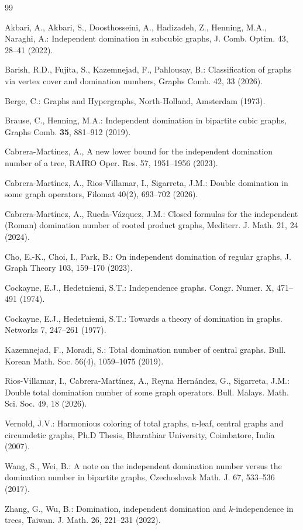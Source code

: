 \documentclass[12pt]{article}
\begin{document}
\begin{thebibliography}{99}

Akbari, A., Akbari, S., Doosthosseini, A., Hadizadeh, Z., Henning,  M.A., Naraghi, A.: Independent domination in subcubic graphs, J. Comb. Optim. 43, 28--41 (2022).


Barish, R.D., Fujita, S., Kazemnejad, F., Pahlousay, B.: Classification of graphs via vertex cover and domination numbers, Graphs Comb. 42, 33 (2026).

Berge, C.: Graphs and Hypergraphs, North-Holland, Amsterdam (1973).

Brause, C., Henning, M.A.: Independent domination in bipartite cubic graphs, Graphs Comb. \textbf{35}, 881--912 (2019).

Cabrera-Mart\'inez, A., A new lower bound for the independent domination number of a tree, RAIRO Oper. Res. 57, 1951--1956 (2023).


Cabrera-Mart\'inez, A., Rios-Villamar, I., Sigarreta, J.M.: Double domination in some graph operators, Filomat 40(2), 693--702 (2026).

Cabrera-Mart\'inez, A., Rueda-V\'azquez, J.M.: Closed formulas for the independent (Roman) domination number of rooted product graphs,  Mediterr. J. Math. 21, 24 (2024).

Cho, E.-K., Choi, I., Park, B.: On independent domination of regular graphs, J. Graph Theory 103, 159--170 (2023).

Cockayne, E.J., Hedetniemi, S.T.: Independence graphs. Congr. Numer. X, 471--491 (1974).

Cockayne, E.J., Hedetniemi, S.T.: Towards a theory of domination in graphs. Networks 7, 247--261 (1977).


Kazemnejad, F., Moradi, S.: Total domination number of central graphs. Bull. Korean Math. Soc. 56(4),
1059--1075 (2019).

Rios-Villamar, I., Cabrera-Mart\'inez, A., Reyna Hern\'andez, G., Sigarreta, J.M.: Double total domination number of some graph operators. Bull. Malays. Math. Sci. Soc. 49, 18 (2026). 


Vernold, J.V.: Harmonious coloring of total graphs, n-leaf, central graphs and circumdetic graphs, Ph.D Thesis, Bharathiar University, Coimbatore, India (2007).

Wang, S., Wei, B.: A note on the independent domination number versus the domination number in bipartite graphs, Czechoslovak Math. J. 67, 533--536 (2017).

Zhang, G., Wu, B.: Domination, independent domination and $k$-independence in trees, Taiwan. J. Math. 26, 221--231 (2022).

\end{thebibliography}
\end{document}
